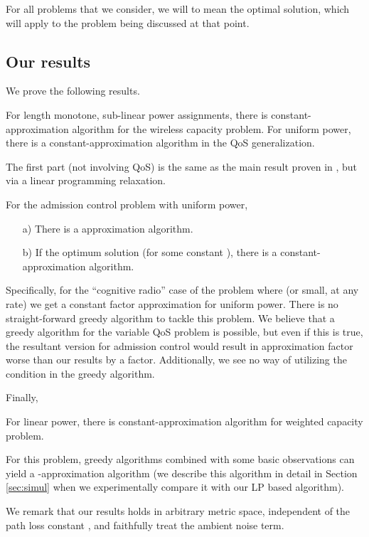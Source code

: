 \documentclass[11pt]{amsart}
\begin{document}
For all problems that we consider, we will  to mean the optimal solution, which will apply to the problem being discussed at that point.

\subsection*{Our results}
We prove the following results.
\begin{theorem}
For length monotone, sub-linear power assignments, there is constant-approximation algorithm for the wireless capacity problem. For uniform power, there is a constant-approximation algorithm in the QoS generalization.
\label{mainth1}
\end{theorem}
The first part (not involving QoS) is the same as the main result proven in \cite{SODA11}, but via a linear programming relaxation.

\begin{theorem}
For the admission control problem with uniform power,
\begin{itemize}
\item[a)] There is a  approximation algorithm. 
\item[b)] If the optimum solution  (for some constant ), there is a constant-approximation algorithm.
\end{itemize}
\label{mainth2}
\end{theorem}
Specifically, for the ``cognitive radio'' case of the problem where  (or small, at any rate) we get a constant factor
approximation for uniform power. There is no straight-forward greedy algorithm to tackle this problem.
We believe that a greedy algorithm for the variable QoS problem is possible, but even if this is true,
the resultant version for admission control would result in approximation factor worse than our results by a  factor. Additionally, we see no way of utilizing the  condition in the greedy algorithm.

Finally,
\begin{theorem}
For linear power, there is  constant-approximation algorithm for weighted capacity problem.
\label{mainth3}
\end{theorem}
For this problem, greedy algorithms combined with some basic observations can yield  a -approximation algorithm (we describe this algorithm in detail in Section \ref{sec:simul} when we experimentally compare it with our LP based algorithm). 

We remark that our results holds in arbitrary metric space, independent of the path loss constant , and faithfully treat the ambient noise term.
\end{document}
